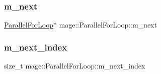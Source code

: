 \subsubsection{\texorpdfstring{m\+\_\+next}{m\_next}}
{\footnotesize\ttfamily \hyperlink{classmage_1_1_parallel_for_loop}{Parallel\+For\+Loop}$\ast$ mage\+::\+Parallel\+For\+Loop\+::m\+\_\+next}

\hypertarget{classmage_1_1_parallel_for_loop_a3d0ef5cd968afc70d03cd1b740fcf4cb}{}\label{classmage_1_1_parallel_for_loop_a3d0ef5cd968afc70d03cd1b740fcf4cb} 
\subsubsection{\texorpdfstring{m\+\_\+next\+\_\+index}{m\_next\_index}}
{\footnotesize\ttfamily size\+\_\+t mage\+::\+Parallel\+For\+Loop\+::m\+\_\+next\+\_\+index}

